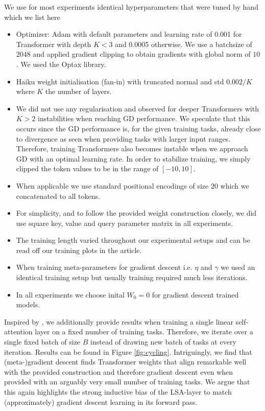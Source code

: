\documentclass{article}
\theoremstyle{plain}
\theoremstyle{definition}
\theoremstyle{remark}
\begin{document}
We use for most experiments identical hyperparameters that were tuned by hand which we list here

\label{app:ex_det}
\begin{itemize}
    \item Optimizer: Adam \citep{adam} with default parameters and learning rate of 0.001 for Transformer with depth $K<3$ and 0.0005 otherwise. We use a batchsize of 2048 and applied gradient clipping to obtain gradients with global norm of $10$. We used the Optax library. 
    \item Haiku weight initialisation (fan-in) with truncated normal and std $0.002/K$ where $K$ the number of layers.
    \item We did not use any regularisation and observed for deeper Transformers with $K>2$ instabilities when reaching GD performance. We speculate that this occurs since the GD performance is, for the given training tasks, already close to divergence as seen when providing tasks with larger input ranges. 
    Therefore, training Transformers also becomes instable when we approach GD with an optimal learning rate. In order to stabilize training, we simply clipped the token values to be in the range of $[-10, 10]$.
    \item  When applicable we use standard positional encodings of size $20$ which we concatenated to all tokens.
    \item  For simplicity, and to follow the provided weight construction closely, we did use square key, value and query parameter matrix in all experiments.
    \item The training length varied throughout our experimental setups and can be read off our training plots in the article. 
    \item When training meta-parameters for gradient descent i.e. $\eta$ and $\gamma$ we used an identical training setup but usually training required much less iterations.
    \item In all experiments we choose inital $W_0=0$ for gradient descent trained models.
\end{itemize}

Inspired by \cite{simple_case_study}, we additionally provide results when training a single linear self-attention layer on a fixed number of training tasks. Therefore, we iterate over a single fixed batch of size $B$ instead of drawing new batch of tasks at every iteration. Results can be found in Figure \ref{fig:cycling}. Intriguingly, we find that (meta-)gradient descent finds Transformer weights that align remarkable well with the provided construction and therefore gradient descent even when provided with an arguably very small number of training tasks. We argue that this again highlights the strong inductive bias of the LSA-layer to match (approximately) gradient descent learning in its forward pass.
\end{document}
